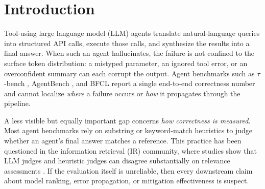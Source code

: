 \documentclass[preprint,review,12pt,3p]{elsarticle}
\begin{document}


\section{Introduction}
\label{sec:intro}

Tool-using large language model (LLM) agents translate natural-language
queries into structured API calls, execute those calls, and synthesize
the results into a final answer.
When such an agent hallucinates, the failure is not confined to the
surface token distribution: a mistyped parameter, an ignored tool error,
or an overconfident summary can each corrupt the output.
Agent benchmarks such as $\tau$-bench \citep{yao2024tau},
AgentBench \citep{liu2024agentbench}, and BFCL \citep{yan2025bfcl}
report a single end-to-end correctness number and cannot localize
\emph{where} a failure occurs or \emph{how} it propagates through the
pipeline.

A less visible but equally important gap concerns \emph{how correctness
is measured}.
Most agent benchmarks rely on substring or keyword-match heuristics to
judge whether an agent's final answer matches a reference.
This practice has been questioned in the information retrieval (IR)
community, where studies show that LLM judges and heuristic judges can
disagree substantially on relevance assessments
\citep{soboroff2024dont,thomas2024searcher,alaofi2024fooled}.
If the evaluation itself is unreliable, then every downstream claim about
model ranking, error propagation, or mitigation effectiveness is suspect.
\end{document}
